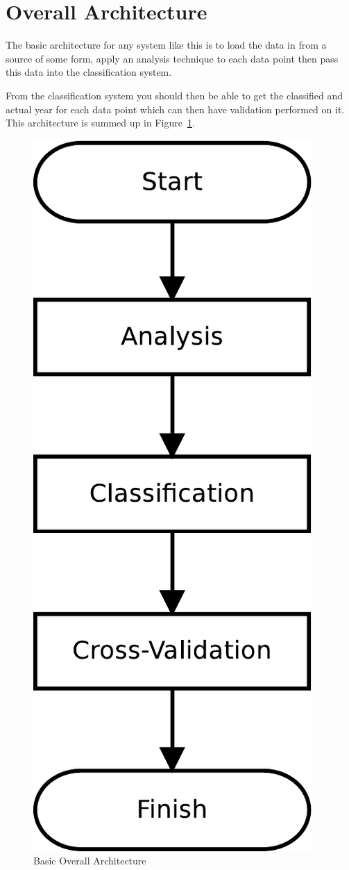 \section{Overall Architecture}
The basic architecture for any system like this is to load the data in from a source of some form,
apply an analysis technique to each data point then pass this data into the classification system.

From the classification system you should then be able to get the classified and actual year for
each data point which can then have validation performed on it. This architecture is summed up in
Figure~\ref{fig:basic-arch}.

\begin{figure}[h]
\centering
\includegraphics[scale=0.4]{img/basic-arch}
\caption{Basic Overall Architecture}\label{fig:basic-arch}
\end{figure}


